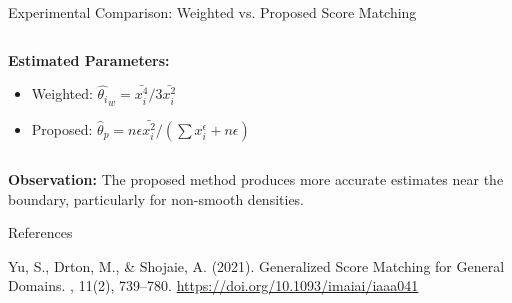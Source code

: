 \documentclass[aspectratio=169]{beamer}
\begin{document}
\begin{frame}{Experimental Comparison: Weighted  vs. Proposed Score Matching}
\begin{columns}
\begin{column}{0.48\textwidth}
    \textbf{Estimated Parameters:}
    \begin{itemize}
      \item Weighted: \quad \( \hat{\theta_i}_w = \bar{x_i^4}/3\bar{x_i^2} \)
      \item Proposed: \quad \( \hat{\theta}_p = n\epsilon\bar{x_i^2}/\left(\sum x_i^\epsilon + n\epsilon\right)\)
    \end{itemize}
  \end{column}
\end{columns}

\vspace{1em}
\textbf{Observation:} The proposed method produces more accurate estimates near the boundary, particularly for non-smooth densities.

\end{frame}
\begin{frame}{References}

\small

\begin{thebibliography}{99}

Yu, S., Drton, M., \& Shojaie, A. (2021). 
\newblock Generalized Score Matching for General Domains.
, 11(2), 739--780.
\newblock \url{https://doi.org/10.1093/imaiai/iaaa041}

\end{thebibliography}

\end{frame}
\end{document}
